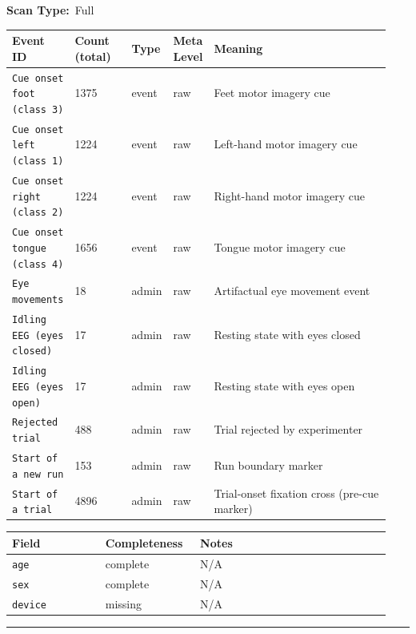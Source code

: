 {\begin{tcolorbox}
{\noindent\textbf{Scan Type:}~Full\par\smallskip
}
\smallskip{}\par\smallskip
\begingroup\scriptsize\setlength{\tabcolsep}{2pt}
\begin{tabular}{@{}p{0.1567\linewidth}p{0.1567\linewidth}p{0.0783\linewidth}p{0.0783\linewidth}p{0.4700\linewidth}@{}}
\toprule
\textbf{Event ID} & \textbf{Count (total)} & \textbf{Type} & \textbf{Meta Level} & \textbf{Meaning} \\
\midrule
\texttt{Cue onset foot (class 3)} & 1375 & event & raw & Feet motor imagery cue \\
\texttt{Cue onset left (class 1)} & 1224 & event & raw & Left-hand motor imagery cue \\
\texttt{Cue onset right (class 2)} & 1224 & event & raw & Right-hand motor imagery cue \\
\texttt{Cue onset tongue (class 4)} & 1656 & event & raw & Tongue motor imagery cue \\
\texttt{Eye movements} & 18 & admin & raw & Artifactual eye movement event \\
\texttt{Idling EEG (eyes closed)} & 17 & admin & raw & Resting state with eyes closed \\
\texttt{Idling EEG (eyes open)} & 17 & admin & raw & Resting state with eyes open \\
\texttt{Rejected trial} & 488 & admin & raw & Trial rejected by experimenter \\
\texttt{Start of a new run} & 153 & admin & raw & Run boundary marker \\
\texttt{Start of a trial} & 4896 & admin & raw & Trial-onset fixation cross (pre-cue marker) \\
\bottomrule
\end{tabular}
\endgroup
\smallskip{}\par\smallskip
\begingroup\scriptsize\setlength{\tabcolsep}{2pt}
\begin{tabular}{@{}p{0.2350\linewidth}p{0.2350\linewidth}p{0.4700\linewidth}@{}}
\toprule
\textbf{Field} & \textbf{Completeness} & \textbf{Notes} \\
\midrule
\texttt{age} & complete & N/A \\
\texttt{sex} & complete & N/A \\
\texttt{device} & missing & N/A \\
\bottomrule
\end{tabular}
\endgroup
\noindent\rule{\linewidth}{0.7pt}\par\nopagebreak

\end{tcolorbox}}

